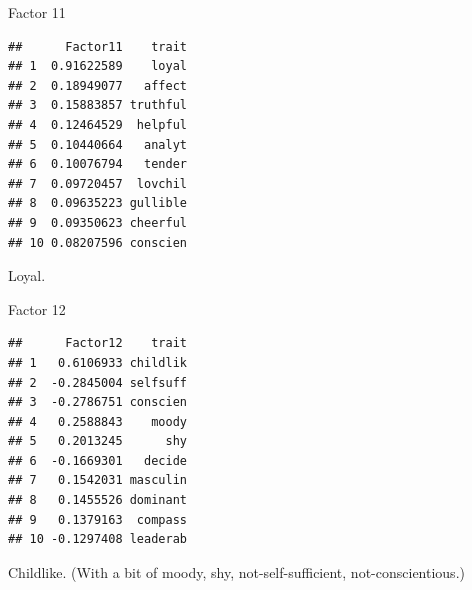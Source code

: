 \documentclass[ignorenonframetext,]{beamer}
\newenvironment{Shaded}{\begin{snugshade}}{\end{snugshade}}
\newcommand{\DecValTok}[1]{\textcolor[rgb]{0.00,0.00,0.81}{#1}}
\newcommand{\KeywordTok}[1]{\textcolor[rgb]{0.13,0.29,0.53}{\textbf{#1}}}
\newcommand{\NormalTok}[1]{#1}
\newcommand{\OperatorTok}[1]{\textcolor[rgb]{0.81,0.36,0.00}{\textbf{#1}}}
\newcommand{\StringTok}[1]{\textcolor[rgb]{0.31,0.60,0.02}{#1}}
\begin{document}
\begin{frame}[fragile]{Factor 11}
\protect\hypertarget{factor-11}{}

\footnotesize

\begin{Shaded}
\end{Shaded}

\begin{verbatim}
##      Factor11    trait
## 1  0.91622589    loyal
## 2  0.18949077   affect
## 3  0.15883857 truthful
## 4  0.12464529  helpful
## 5  0.10440664   analyt
## 6  0.10076794   tender
## 7  0.09720457  lovchil
## 8  0.09635223 gullible
## 9  0.09350623 cheerful
## 10 0.08207596 conscien
\end{verbatim}

\normalsize

Loyal.

\end{frame}

\begin{frame}[fragile]{Factor 12}
\protect\hypertarget{factor-12}{}

\footnotesize

\begin{Shaded}
\end{Shaded}

\begin{verbatim}
##      Factor12    trait
## 1   0.6106933 childlik
## 2  -0.2845004 selfsuff
## 3  -0.2786751 conscien
## 4   0.2588843    moody
## 5   0.2013245      shy
## 6  -0.1669301   decide
## 7   0.1542031 masculin
## 8   0.1455526 dominant
## 9   0.1379163  compass
## 10 -0.1297408 leaderab
\end{verbatim}

\normalsize

Childlike. (With a bit of moody, shy, not-self-sufficient,
not-conscientious.)

\end{frame}
\end{document}
